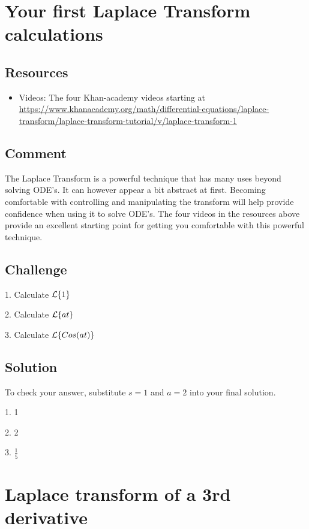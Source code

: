 \section{Your first Laplace Transform calculations}

\subsection*{Resources}
\begin{itemize}
    \item Videos: The four Khan-academy videos starting at \url{https://www.khanacademy.org/math/differential-equations/laplace-transform/laplace-transform-tutorial/v/laplace-transform-1}
\end{itemize}

\subsection*{Comment}
The Laplace Transform is a powerful technique that has many uses beyond solving ODE's. It can however appear a bit abstract at first. Becoming comfortable with controlling and manipulating the transform will help provide confidence when using it to solve ODE's. The four videos in the resources above provide an excellent starting point for getting you comfortable with this powerful technique.

\subsection*{Challenge}
1. Calculate $\mathcal{L}\{1\}$

2. Calculate $\mathcal{L}\{at\}$

3. Calculate $\mathcal{L}\{Cos(at)\}$

\subsection*{Solution}
To check your answer, substitute $s=1$ and $a=2$ into your final solution.

1. 1

2. 2

3. $\frac{1}{5}$




\newpage
\section{Laplace transform of a 3rd derivative}

